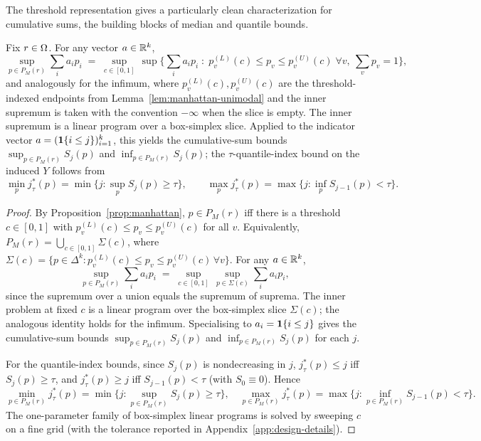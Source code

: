 The threshold representation gives a particularly clean characterization for cumulative sums, the building blocks of median and quantile bounds.

\begin{lemma}\label{lem:l1-linear}
Fix \(r\in\Omega\). For any vector \(a\in\mathbb{R}^k\),
\[
\sup_{p\in P_M(r)} \sum_i a_i p_i
\;=\;
\sup_{c\in[0,1]}\,\sup\Big\{\textstyle\sum_i a_i p_i \;:\; p_v^{(L)}(c)\le p_v\le p_v^{(U)}(c)\;\forall v,\ \sum_v p_v=1\Big\},
\]
and analogously for the infimum, where \(p_v^{(L)}(c),p_v^{(U)}(c)\) are the threshold-indexed endpoints from Lemma~\ref{lem:manhattan-unimodal} and the inner supremum is taken with the convention \(-\infty\) when the slice is empty. The inner supremum is a linear program over a box-simplex slice. Applied to the indicator vector \(a=(\mathbf{1}\{i\le j\})_{i=1}^k\), this yields the cumulative-sum bounds \(\sup_{p\in P_M(r)} S_j(p)\) and \(\inf_{p\in P_M(r)} S_j(p)\); the \(\tau\)-quantile-index bound on the induced \(Y\) follows from
\[
\min_{p}j^*_\tau(p)=\min\{j:\sup_p S_j(p)\ge\tau\},\qquad \max_{p}j^*_\tau(p)=\max\{j:\inf_p S_{j-1}(p)<\tau\}.
\]
\end{lemma}

\begin{proof}
By Proposition~\ref{prop:manhattan}, \(p\in P_M(r)\) iff there is a threshold \(c\in[0,1]\) with \(p_v^{(L)}(c)\le p_v\le p_v^{(U)}(c)\) for all \(v\). Equivalently, \(P_M(r)=\bigcup_{c\in[0,1]}\Sigma(c)\), where \(\Sigma(c)=\{p\in\Delta^k:p_v^{(L)}(c)\le p_v\le p_v^{(U)}(c)\,\forall v\}\). For any \(a\in\mathbb{R}^k\),
\[
\sup_{p\in P_M(r)} \textstyle\sum_i a_i p_i
\;=\;\sup_{c\in[0,1]}\,\sup_{p\in\Sigma(c)}\textstyle\sum_i a_i p_i,
\]
since the supremum over a union equals the supremum of suprema. The inner problem at fixed \(c\) is a linear program over the box-simplex slice \(\Sigma(c)\); the analogous identity holds for the infimum. Specialising to \(a_i=\mathbf{1}\{i\le j\}\) gives the cumulative-sum bounds \(\sup_{p\in P_M(r)} S_j(p)\) and \(\inf_{p\in P_M(r)} S_j(p)\) for each \(j\).

For the quantile-index bounds, since \(S_j(p)\) is nondecreasing in \(j\), \(j^*_\tau(p)\le j\) iff \(S_j(p)\ge\tau\), and \(j^*_\tau(p)\ge j\) iff \(S_{j-1}(p)<\tau\) (with \(S_0\equiv 0\)). Hence
\[
\min_{p\in P_M(r)}j^*_\tau(p)=\min\{j:\sup_{p\in P_M(r)} S_j(p)\ge\tau\},\quad
\max_{p\in P_M(r)}j^*_\tau(p)=\max\{j:\inf_{p\in P_M(r)} S_{j-1}(p)<\tau\}.
\]
The one-parameter family of box-simplex linear programs is solved by sweeping \(c\) on a fine grid (with the tolerance reported in Appendix~\ref{app:design-details}).
\end{proof}


